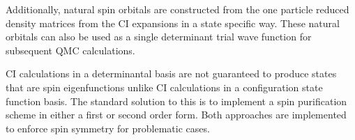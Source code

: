 Additionally, natural spin orbitals are constructed from the one particle reduced density matrices from the CI expansions in a state specific way.
These natural orbitals can also be used as a single determinant trial wave function for subsequent QMC calculations.

CI calculations in a determinantal basis are not guaranteed to produce states that are spin eigenfunctions unlike CI calculations in a configuration state function basis.
The standard solution to this is to implement a spin purification scheme in either a first or second order form.\citehere
Both approaches are implemented to enforce spin symmetry for problematic cases.

%

% 
% 

